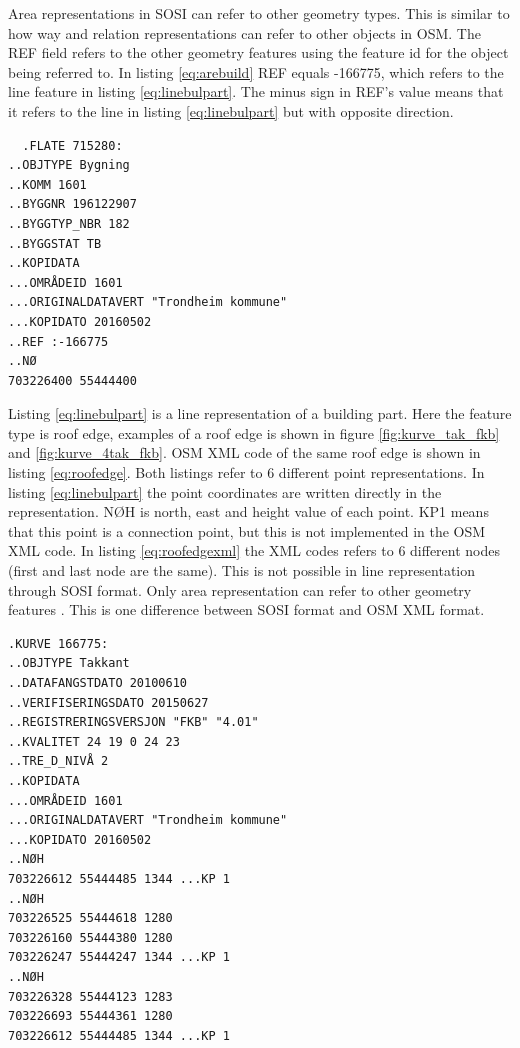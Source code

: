 Area representations in SOSI can refer to other geometry types. This is similar to how way and relation representations can refer to other objects in OSM. The REF field refers to the other geometry features using the feature id for the object being referred to. In listing \ref{eq:arebuild} REF equals -166775, which refers to the line feature in listing \ref{eq:linebulpart}. The minus sign in REF's value means that it refers to the line in listing \ref{eq:linebulpart} but with opposite direction. 

\begin{lstlisting}
  .FLATE 715280:
..OBJTYPE Bygning
..KOMM 1601
..BYGGNR 196122907
..BYGGTYP_NBR 182
..BYGGSTAT TB
..KOPIDATA
...OMRÅDEID 1601
...ORIGINALDATAVERT "Trondheim kommune"
...KOPIDATO 20160502
..REF :-166775
..NØ
703226400 55444400
\end{lstlisting}

Listing \ref{eq:linebulpart} is a line representation of a building part. Here the feature type is roof edge, examples of a roof edge is shown in figure \ref{fig:kurve_tak_fkb} and \ref{fig:kurve_4tak_fkb}. OSM XML code of the same roof edge is shown in listing \ref{eq:roofedge}. Both listings refer to 6 different point representations. In listing \ref{eq:linebulpart} the point coordinates are written directly in the representation. NØH is north, east and height value of each point. KP1 means that this point is a connection point, but this is not implemented in the OSM XML code. In listing \ref{eq:roofedgexml} the XML codes refers to 6 different nodes (first and last node are the same). This is not possible in line representation through SOSI format. Only area representation can refer to other geometry features \cite{Kartverket2006}. This is one difference between SOSI format and OSM XML format. 

\begin{lstlisting}
.KURVE 166775:
..OBJTYPE Takkant
..DATAFANGSTDATO 20100610
..VERIFISERINGSDATO 20150627
..REGISTRERINGSVERSJON "FKB" "4.01"
..KVALITET 24 19 0 24 23
..TRE_D_NIVÅ 2
..KOPIDATA
...OMRÅDEID 1601
...ORIGINALDATAVERT "Trondheim kommune"
...KOPIDATO 20160502
..NØH
703226612 55444485 1344 ...KP 1
..NØH
703226525 55444618 1280
703226160 55444380 1280
703226247 55444247 1344 ...KP 1
..NØH
703226328 55444123 1283
703226693 55444361 1280
703226612 55444485 1344 ...KP 1
\end{lstlisting}
 


